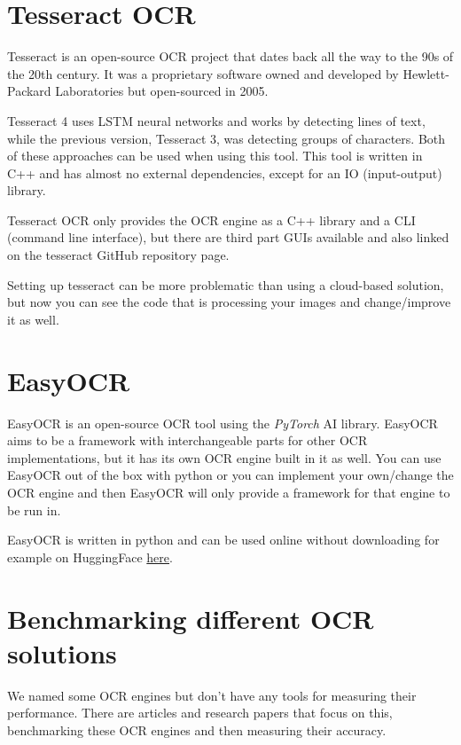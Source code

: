 \documentclass[
  digital,     %
  oneside,     %
  nosansbold,  %
  nocolorbold, %
  nolof,         %
  nolot,         %
]{fithesis4}
\begin{document}
\section{Tesseract OCR\cite{tesseract}}

Tesseract is an open-source OCR project that dates back all the way to the 90s of the 20th century. It was a proprietary software owned and developed by Hewlett-Packard Laboratories but open-sourced in 2005.

Tesseract 4 uses LSTM neural networks and works by detecting lines of text, while the previous version, Tesseract 3, was detecting groups of characters. Both of these approaches can be used when using this tool. This tool is written in C++ and has almost no external dependencies, except for an IO (input-output) library.

Tesseract OCR only provides the OCR engine as a C++ library and a CLI (command line interface), but there are third part GUIs available and also linked on the tesseract GitHub repository page.

Setting up tesseract can be more problematic than using a cloud-based solution, but now you can see the code that is processing your images and change/improve it as well.

\section{EasyOCR\cite{easyocr}}

EasyOCR is an open-source OCR tool using the \emph{PyTorch}\cite{pytorch} AI library. EasyOCR aims to be a framework with interchangeable parts for other OCR implementations, but it has its own OCR engine built in it as well. You can use EasyOCR out of the box with python or you can implement your own/change the OCR engine and then EasyOCR will only provide a framework for that engine to be run in.

EasyOCR is written in python and can be used online without downloading for example on HuggingFace \href{https://huggingface.co/spaces/tomofi/EasyOCR}{here}.

\section{Benchmarking different OCR solutions}

We named some OCR engines but don't have any tools for measuring their performance. There are articles and research papers that focus on this, benchmarking these OCR engines and then measuring their accuracy\cite{benchmark}.
\end{document}
